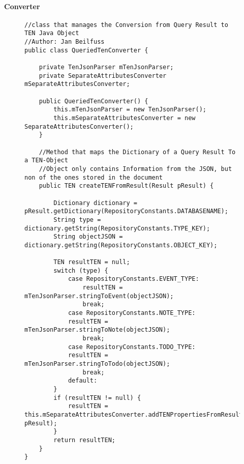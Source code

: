 		\paragraph{Converter}
\begin{figure}[H]
\begin{lstlisting}[caption=QuerriedTenConverter (Jan Beilfuß)]
//class that manages the Conversion from Query Result to TEN Java Object
//Author: Jan Beilfuss
public class QueriedTenConverter {

    private TenJsonParser mTenJsonParser;
    private SeparateAttributesConverter mSeparateAttributesConverter;

    public QueriedTenConverter() {
        this.mTenJsonParser = new TenJsonParser();
        this.mSeparateAttributesConverter = new SeparateAttributesConverter();
    }

    //Method that maps the Dictionary of a Query Result To a TEN-Object
    //Object only contains Information from the JSON, but non of the ones stored in the document
    public TEN createTENFromResult(Result pResult) {

        Dictionary dictionary = pResult.getDictionary(RepositoryConstants.DATABASENAME);
        String type = dictionary.getString(RepositoryConstants.TYPE_KEY);
        String objectJSON = dictionary.getString(RepositoryConstants.OBJECT_KEY);

        TEN resultTEN = null;
        switch (type) {
            case RepositoryConstants.EVENT_TYPE:
                resultTEN = mTenJsonParser.stringToEvent(objectJSON);
                break;
            case RepositoryConstants.NOTE_TYPE:
            resultTEN = mTenJsonParser.stringToNote(objectJSON);
                break;
            case RepositoryConstants.TODO_TYPE:
            resultTEN = mTenJsonParser.stringToTodo(objectJSON);
                break;
            default:
        }
        if (resultTEN != null) {
            resultTEN = this.mSeparateAttributesConverter.addTENPropertiesFromResult(resultTEN, pResult);
        }
        return resultTEN;
    }
}
\end{lstlisting}
\end{figure}

